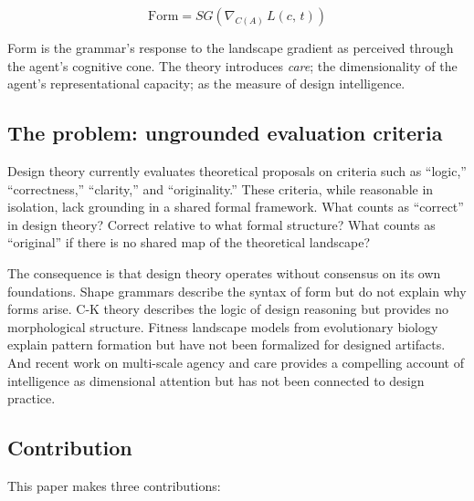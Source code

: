 \begin{equation*}
\mathrm{Form} = SG\!\left(\nabla_{C(A)}\, L(c,\, t)\right)
\end{equation*}

\noindent Form is the grammar's response to the landscape gradient as perceived through the agent's cognitive cone. The theory introduces \textit{care}; the dimensionality of the agent's representational capacity; as the measure of design intelligence.

\subsection{The problem: ungrounded evaluation criteria}

Design theory currently evaluates theoretical proposals on criteria such as ``logic,'' ``correctness,'' ``clarity,'' and ``originality.'' These criteria, while reasonable in isolation, lack grounding in a shared formal framework. What counts as ``correct'' in design theory? Correct relative to what formal structure? What counts as ``original'' if there is no shared map of the theoretical landscape?

The consequence is that design theory operates without consensus on its own foundations. Shape grammars describe the syntax of form but do not explain why forms arise. C-K theory describes the logic of design reasoning but provides no morphological structure. Fitness landscape models from evolutionary biology explain pattern formation but have not been formalized for designed artifacts. And recent work on multi-scale agency and care \parencite{Doctor2024} provides a compelling account of intelligence as dimensional attention but has not been connected to design practice.

\subsection{Contribution}

This paper makes three contributions:

